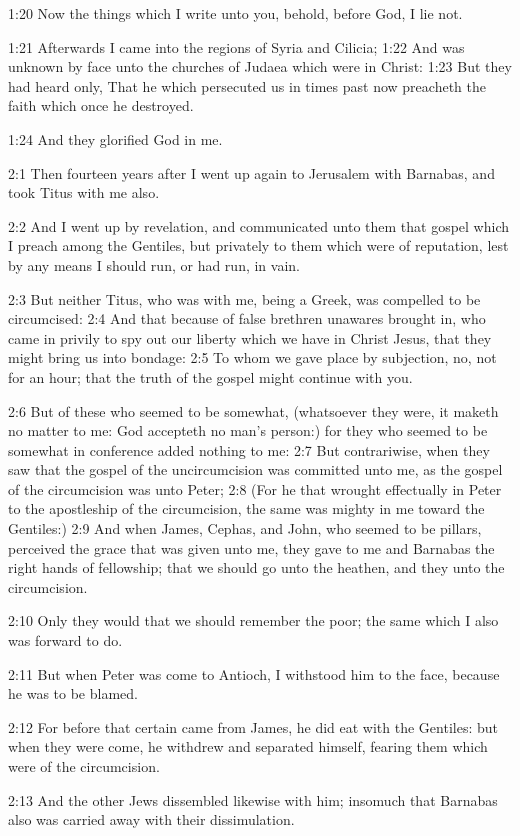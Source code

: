 1:20 Now the things which I write unto you, behold, before God, I lie
not.

1:21 Afterwards I came into the regions of Syria and Cilicia; 1:22 And
was unknown by face unto the churches of Judaea which were in Christ:
1:23 But they had heard only, That he which persecuted us in times
past now preacheth the faith which once he destroyed.

1:24 And they glorified God in me.

2:1 Then fourteen years after I went up again to Jerusalem with
Barnabas, and took Titus with me also.

2:2 And I went up by revelation, and communicated unto them that
gospel which I preach among the Gentiles, but privately to them which
were of reputation, lest by any means I should run, or had run, in
vain.

2:3 But neither Titus, who was with me, being a Greek, was compelled
to be circumcised: 2:4 And that because of false brethren unawares
brought in, who came in privily to spy out our liberty which we have
in Christ Jesus, that they might bring us into bondage: 2:5 To whom we
gave place by subjection, no, not for an hour; that the truth of the
gospel might continue with you.

2:6 But of these who seemed to be somewhat, (whatsoever they were, it
maketh no matter to me: God accepteth no man's person:) for they who
seemed to be somewhat in conference added nothing to me: 2:7 But
contrariwise, when they saw that the gospel of the uncircumcision was
committed unto me, as the gospel of the circumcision was unto Peter;
2:8 (For he that wrought effectually in Peter to the apostleship of
the circumcision, the same was mighty in me toward the Gentiles:) 2:9
And when James, Cephas, and John, who seemed to be pillars, perceived
the grace that was given unto me, they gave to me and Barnabas the
right hands of fellowship; that we should go unto the heathen, and
they unto the circumcision.

2:10 Only they would that we should remember the poor; the same which
I also was forward to do.

2:11 But when Peter was come to Antioch, I withstood him to the face,
because he was to be blamed.

2:12 For before that certain came from James, he did eat with the
Gentiles: but when they were come, he withdrew and separated himself,
fearing them which were of the circumcision.

2:13 And the other Jews dissembled likewise with him; insomuch that
Barnabas also was carried away with their dissimulation.

